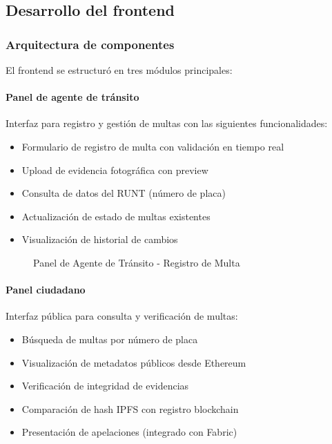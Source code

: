 \subsection{Desarrollo del frontend}

\subsubsection{Arquitectura de componentes}

El frontend se estructuró en tres módulos principales:

\paragraph{Panel de agente de tránsito}
Interfaz para registro y gestión de multas con las siguientes funcionalidades:
\begin{itemize}
    \item Formulario de registro de multa con validación en tiempo real
    \item Upload de evidencia fotográfica con preview
    \item Consulta de datos del RUNT (número de placa)
    \item Actualización de estado de multas existentes
    \item Visualización de historial de cambios
\end{itemize}

\begin{figure}[htbp]
    \centering
    \caption{Panel de Agente de Tránsito - Registro de Multa}
    \label{fig:ui_panel_agente}
\end{figure}

\paragraph{Panel ciudadano}
Interfaz pública para consulta y verificación de multas:
\begin{itemize}
    \item Búsqueda de multas por número de placa
    \item Visualización de metadatos públicos desde Ethereum
    \item Verificación de integridad de evidencias
    \item Comparación de hash IPFS con registro blockchain
    \item Presentación de apelaciones (integrado con Fabric)
\end{itemize}

